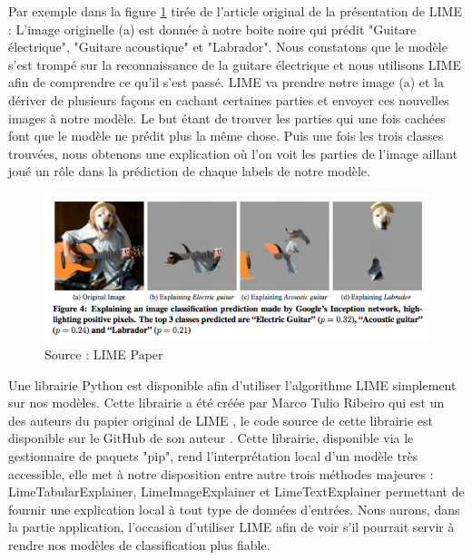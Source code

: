 Par exemple dans la figure \ref{limeExemple} tirée de l'article original de la présentation de LIME\cite{limePaper} : L'image originelle (a) est donnée à notre boite noire qui prédit "Guitare électrique", "Guitare acoustique" et "Labrador". Nous constatons que le modèle s'est trompé sur la reconnaissance de la guitare électrique et nous utilisons LIME afin de comprendre ce qu'il s'est passé. LIME va prendre notre image (a) et la dériver de plusieurs façons en cachant certaines parties et envoyer ces nouvelles images à notre modèle. Le but étant de trouver les parties qui une fois cachées font que le modèle ne prédit plus la même chose. Puis une fois les trois classes trouvées, nous obtenons une explication où l'on voit les parties de l'image aillant joué un rôle dans la prédiction de chaque labels de notre modèle.\par
\begin{figure}[h]
\centering
\includegraphics[scale=0.35]{src_img/limeExemple.png}
\caption{Source : LIME Paper \cite{limePaper}}
\label{limeExemple}
\end{figure}
Une librairie Python est disponible afin d'utiliser l'algorithme LIME simplement sur nos modèles. Cette librairie a été créée par Marco Tulio Ribeiro qui est un des auteurs du papier original de LIME \cite{limePaper}, le code source de cette librairie est disponible sur le GitHub de son auteur \cite{limeDepot}. Cette librairie, disponible via le gestionnaire de paquets "pip", rend l'interprétation local d'un modèle très accessible, elle met à notre disposition entre autre trois méthodes majeures : LimeTabularExplainer, LimeImageExplainer et LimeTextExplainer permettant de fournir une explication local à tout type de données d'entrées. Nous aurons, dans la partie application, l'occasion d'utiliser LIME afin de voir s'il pourrait servir à rendre nos modèles de classification plus fiable.

